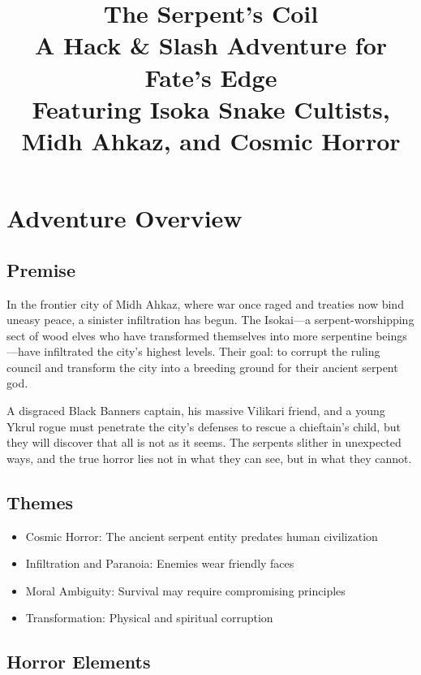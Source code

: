 \documentclass[12pt,twoside]{article}
\title{
  \textbf{\Huge The Serpent's Coil} \\
  \Large A Hack \& Slash Adventure for Fate's Edge \\
  \vspace{1cm}
  \large Featuring Isoka Snake Cultists, Midh Ahkaz, and Cosmic Horror
}
\author{}
\date{}
\begin{document}
\maketitle
\thispagestyle{empty}

\newpage
\setcounter{page}{1}

\tableofcontents
\newpage

\section{Adventure Overview}

\subsection{Premise}

In the frontier city of Midh Ahkaz, where war once raged and treaties now bind uneasy peace, a sinister infiltration has begun. The Isokai—a serpent-worshipping sect of wood elves who have transformed themselves into more serpentine beings—have infiltrated the city's highest levels. Their goal: to corrupt the ruling council and transform the city into a breeding ground for their ancient serpent god.

A disgraced Black Banners captain, his massive Vilikari friend, and a young Ykrul rogue must penetrate the city's defenses to rescue a chieftain's child, but they will discover that all is not as it seems. The serpents slither in unexpected ways, and the true horror lies not in what they can see, but in what they cannot.

\subsection{Themes}

\begin{itemize}
  \item Cosmic Horror: The ancient serpent entity predates human civilization
  \item Infiltration and Paranoia: Enemies wear friendly faces
  \item Moral Ambiguity: Survival may require compromising principles
  \item Transformation: Physical and spiritual corruption
\end{itemize}

\subsection{Horror Elements}
\end{document}
